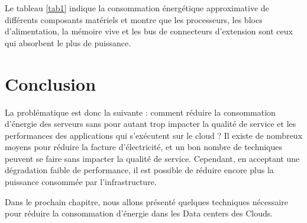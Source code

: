 \begin{onehalfspace}
Le tableau \ref{tab1} indique la consommation énergétique approximative de différents composants matériels et montre que les processeurs, les blocs d’alimentation, la mémoire vive et les bus de connecteurs d’extension sont ceux qui absorbent le plus de puissance.
\end{onehalfspace}



\section{Conclusion}
\begin{onehalfspace}
La problématique est donc la suivante : comment réduire la consommation d'énergie des serveurs sans pour autant trop impacter la qualité de service et les performances des applications qui s'exécutent sur le cloud ? Il existe de nombreux moyens pour réduire la facture d'électricité, et un bon nombre de techniques peuvent se faire sans impacter la qualité de service. Cependant, en acceptant une dégradation faible de performance, il est possible de réduire encore plus la puissance consommée par l'infrastructure.\medskip

Dans le prochain chapitre, nous allons présenté quelques techniques nécessaire pour réduire la consommation d'énergie dans les Data centers des Clouds.
\end{onehalfspace}

